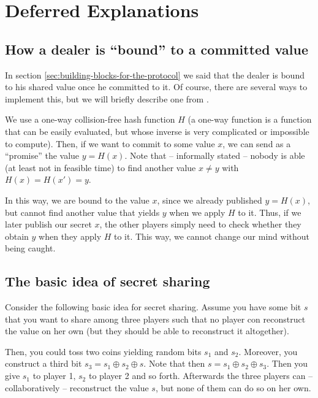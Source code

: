 \section{Deferred Explanations}
\label{sec:deferred-proofs}

\subsection{How a dealer is ``bound'' to a committed value}
\label{sec:dealer-bound-to-commited-value}

In section \ref{sec:building-blocks-for-the-protocol} we said that the dealer is bound to his shared value once he committed to it. Of course, there are several ways to implement this, but we will briefly describe one from \cite{lecture-notes-goldwasser-bellare}.

We use a one-way collision-free hash function $H$ (a one-way function is a function that can be easily evaluated, but whose inverse is very complicated or impossible to compute). Then, if we want to commit to some value $x$, we can send as a ``promise'' the value $y=H(x)$. Note that -- informally stated -- nobody is able (at least not in feasible time) to find another value $x\neq y$ with $H(x)=H(x')=y$.

In this way, we are bound to the value $x$, since we already published $y=H(x)$, but cannot find another value that yields $y$ when we apply $H$ to it. Thus, if we later publish our secret $x$, the other players simply need to check whether they obtain $y$ when they apply $H$ to it. This way, we cannot change our mind without being caught.

\subsection{The basic idea of secret sharing}
\label{sec:appendix-basic-idea-secret-sharing}

Consider the following basic idea for secret sharing. Assume you have some bit $s$ that you want to share among three players such that no player con reconstruct the value on her own (but they should be able to reconstruct it altogether). 

Then, you could toss two coins yielding random bits $s_1$ and $s_2$. Moreover, you construct a third bit $s_3=s_1\oplus s_2\oplus s$. Note that then $s=s_1\oplus s_2 \oplus s_3$. Then you give $s_1$ to player 1, $s_2$ to player 2 and so forth. Afterwards the three players can -- collaboratively -- reconstruct the value $s$, but none of them can do so on her own.


